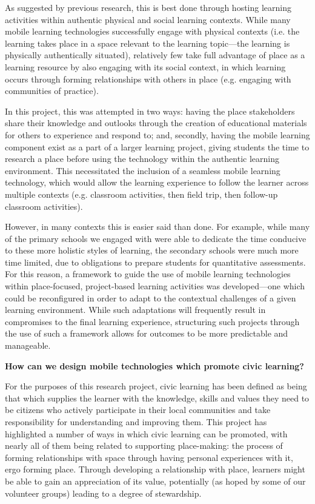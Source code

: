 As suggested by previous research, this is best done through hosting learning activities within authentic physical and social learning contexts. While many mobile learning technologies successfully engage with physical contexts (i.e. the learning takes place in a space relevant to the learning topic---the learning is physically authentically situated), relatively few take full advantage of place as a learning resource by also engaging with its social context, in which learning occurs through forming relationships with others in place (e.g. engaging with communities of practice). 

In this project, this was attempted in two ways: having the place stakeholders share their knowledge and outlooks through the creation of educational materials for others to experience and respond to; and, secondly, having the mobile learning component exist as a part of a larger learning project, giving students the time to research a place before using the technology within the authentic learning environment. This necessitated the inclusion of a seamless mobile learning technology, which would allow the learning experience to follow the learner across multiple contexts (e.g. classroom activities, then field trip, then follow-up classroom activities). 

However, in many contexts this is easier said than done. For example, while many of the primary schools we engaged with were able to dedicate the time conducive to these more holistic styles of learning, the secondary schools were much more time limited, due to obligations to prepare students for quantitative assessments. For this reason, a framework to guide the use of mobile learning technologies within place-focused, project-based learning activities was developed---one which could be reconfigured in order to adapt to the contextual challenges of a given learning environment. While such adaptations will frequently result in compromises to the final learning experience, structuring such projects through the use of such a framework allows for outcomes to be more predictable and manageable. 

\begin{displayquote}
\textbf{How can we design mobile technologies which promote civic learning?}
\end{displayquote}

For the purposes of this research project, civic learning has been defined as being that which supplies the learner with the knowledge, skills and values they need to be citizens who actively participate in their local communities and take responsibility for understanding and improving them. This project has highlighted a number of ways in which civic learning can be promoted, with nearly all of them being related to supporting place-making: the process of forming relationships with space through having personal experiences with it, ergo forming place. Through developing a relationship with place, learners might be able to gain an appreciation of its value, potentially (as hoped by some of our volunteer groups) leading to a degree of stewardship.

